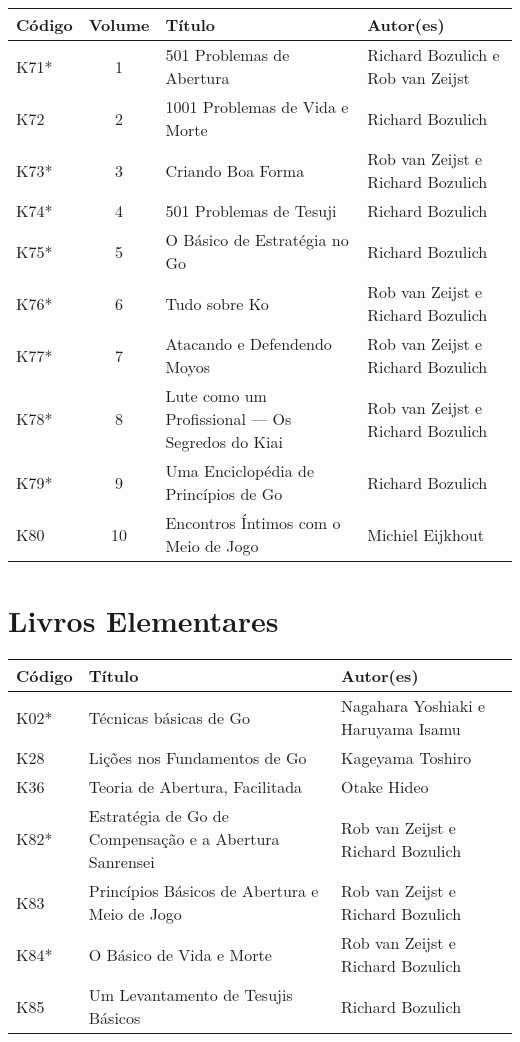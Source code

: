 \begin{longtable}{l|c|p{55mm}|p{35mm}} 
    \hline
    \textbf{Código} & \textbf{Volume} & \textbf{Título} & \textbf{Autor(es)} \\
    \hline \hline
    K71* & 1 & 501 Problemas de Abertura & Richard Bozulich e Rob van Zeijst \\
    \hline
    K72 & 2 & 1001 Problemas de Vida e Morte & Richard Bozulich \\
    \hline
    K73* & 3 & Criando Boa Forma & Rob van Zeijst e Richard Bozulich \\
    \hline
    K74* & 4 & 501 Problemas de Tesuji & Richard Bozulich \\
    \hline
    K75* & 5 & O Básico de Estratégia no Go & Richard Bozulich \\
    \hline
    K76* & 6 & Tudo sobre Ko & Rob van Zeijst e Richard Bozulich \\
    \hline
    K77* & 7 & Atacando e Defendendo Moyos & Rob van Zeijst e Richard Bozulich \\
    \hline
    K78* & 8 & Lute como um Profissional --- Os Segredos do Kiai & Rob van Zeijst e Richard Bozulich \\
    \hline
    K79* & 9 & Uma Enciclopédia de Princípios de Go & Richard Bozulich \\
    \hline
    K80 & 10 & Encontros Íntimos com o Meio de Jogo & Michiel Eijkhout \\
    \hline
\end{longtable}

\pagebreak

\section{Livros Elementares}

\begin{longtable}{l|p{55mm}|p{55mm}} 
    \hline
    \textbf{Código} & \textbf{Título} & \textbf{Autor(es)} \\
    \hline \hline
    K02* & Técnicas básicas de Go & Nagahara Yoshiaki e Haruyama Isamu \\
    \hline
    K28 & Lições nos Fundamentos de Go & Kageyama Toshiro \\
    \hline
    K36 & Teoria de Abertura, Facilitada & Otake Hideo \\
    \hline
    K82* & Estratégia de Go de Compensação e a Abertura Sanrensei & Rob van Zeijst e Richard Bozulich \\
    \hline
    K83 & Princípios Básicos de Abertura e Meio de Jogo & Rob van Zeijst e Richard Bozulich \\
    \hline
    K84* & O Básico de Vida e Morte & Rob van Zeijst e Richard Bozulich \\
    \hline
    K85 & Um Levantamento de Tesujis Básicos & Richard Bozulich \\
    \hline
\end{longtable}

